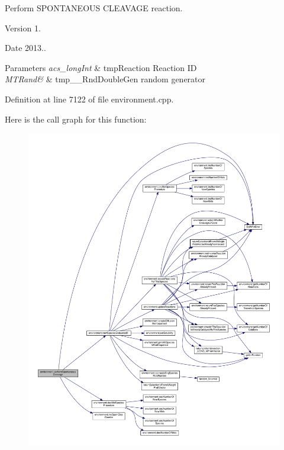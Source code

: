 Perform S\-P\-O\-N\-T\-A\-N\-E\-O\-U\-S C\-L\-E\-A\-V\-A\-G\-E reaction. 

\begin{DoxyVersion}{Version}
1. 
\end{DoxyVersion}
\begin{DoxyDate}{Date}
2013.. 
\end{DoxyDate}

\begin{DoxyParams}{Parameters}
{\em acs\-\_\-long\-Int} & tmp\-Reaction Reaction I\-D \\
\hline
{\em M\-T\-Rand\&} & tmp\-\_\-\-\_\-\-Rnd\-Double\-Gen random generator \\
\hline
\end{DoxyParams}


Definition at line 7122 of file environment.\-cpp.



Here is the call graph for this function\-:\nopagebreak
\begin{figure}[H]
\begin{center}
\leavevmode
\includegraphics[width=350pt]{a00003_a4949138a3771b7f6ec2bfe82cbad947e_cgraph}
\end{center}
\end{figure}




